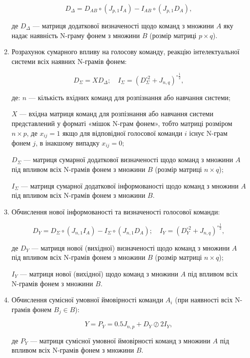\begin{enumerate}
	\[
	D_\Delta=D_{AB} \circ (J_{p,1}I_A)-I_{AB} \circ (J_{p,1}D_A),
	\]
	
	де $D_\Delta$ --- матриця додаткової визначеності щодо команд з множини $A$ яку надає наявність N-граму фонем з множини $B$ (розмір матриці $p\times q$).
	
	\item Розрахунок сумарного впливу на голосову команду, реакцію інтелектуальної системи всіх наявних N-грамів фонем:
	
	\[
	D_\Sigma = XD_\Delta;\quad I_\Sigma=(D_\Sigma^{\circ 2}+J_{n,q})^{\circ \frac{1}{2}},
	\]
	
	де: $n$ --- кількість вхідних команд для розпізнання або навчання системи; 
	
	{\settowidth{\leftskip}{де:\ }
		
		$X$ --- вхідна матриця команд для розпізнання або навчання системи представлений у форматі «мішок N-грам фонем», тобто матриці розміром $n \times p$, де $x_{ij}=1$ якщо для відповідної голосової команди $i$ існує N-грам фонем $j$, в інакшому випадку $x_{ij}=0$;
		
		$D_\Sigma$ --- матриця сумарної додаткової визначеності щодо команд  з множини $A$ під впливом всіх N-грамів фонем з множини $B$ (розмір матриці $n\times q$);
		
		$I_\Sigma$ --- матриця сумарної додаткової інформованості щодо команд  з множини $A$ під впливом всіх N-грамів фонем з множини $B$.
		
	}
	
	\item Обчислення нової інформованості та визначеності голосової команди:
	
	\[
	D_Y=D_\Sigma \circ (J_{n,1}I_A) - I_\Sigma \circ (J_{n,1}D_A);\quad I_Y=(D_Y^{\circ 2}+J_{n,q})^{\circ \frac{1}{2}},
	\]
	
	де $D_Y$ --- матриця нової (вихідної) визначеності щодо команд  з множини $A$ під впливом всіх N-грамів фонем з множини $B$ (розмір матриці $n\times q$); 
	
	$I_Y$ --- матриця нової (вихідної) щодо команд з множини $A$ під впливом всіх N-грамів фонем з множини $B$.
	
	\item Обчислення сумісної умовної ймовірності команди $A_i$ (при наявності всіх N-грамів фонем $B_j \in B$):
	
	\[
	Y=P_Y=0.5J_{n,p}+D_Y \oslash 2I_Y,
	\]
	
	де $P_Y$ --- матриця сумісної умовної ймовірності команд з множини $A$ під впливом всіх N-грамів фонем з множини $B$.
\end{enumerate}

